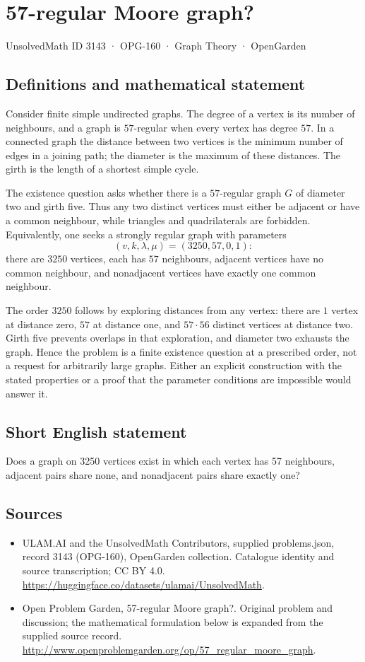 \documentclass[11pt,a4paper]{article}
\begin{document}
\section*{57-regular Moore graph?}\label{3143}
{\small UnsolvedMath ID 3143 · OPG-160 · Graph Theory · OpenGarden}
\subsection{Definitions and mathematical statement}
Consider finite simple undirected graphs. The degree of a vertex is
its number of neighbours, and a graph is $57$-regular when every
vertex has degree $57$. In a connected graph the distance between
two vertices is the minimum number of edges in a joining path;
the diameter is the maximum of these distances. The girth is the
length of a shortest simple cycle.

The existence question asks whether there is a $57$-regular graph
$G$ of diameter two and girth five. Thus any two distinct vertices
must either be adjacent or have a common neighbour, while triangles
and quadrilaterals are forbidden. Equivalently, one seeks a strongly
regular graph with parameters
\[
 (v,k,\lambda,\mu)=(3250,57,0,1):
\]
there are $3250$ vertices, each has $57$ neighbours, adjacent
vertices have no common neighbour, and nonadjacent vertices have
exactly one common neighbour.

The order $3250$ follows by exploring distances from any vertex:
there are $1$ vertex at distance zero, $57$ at distance one, and
$57\cdot56$ distinct vertices at distance two. Girth five prevents
overlaps in that exploration, and diameter two exhausts the graph.
Hence the problem is a finite existence question at a prescribed
order, not a request for arbitrarily large graphs. Either an
explicit construction with the stated properties or a proof that
the parameter conditions are impossible would answer it.
\subsection{Short English statement}
Does a graph on 3250 vertices exist in which each vertex has 57 neighbours, adjacent pairs share none, and nonadjacent pairs share exactly one?
\subsection{Sources}
\begin{itemize}
\item[S1] ULAM.AI and the UnsolvedMath Contributors, supplied problems.json, record 3143 (OPG-160), OpenGarden collection. Catalogue identity and source transcription; CC BY 4.0.
\url{https://huggingface.co/datasets/ulamai/UnsolvedMath}.
\item[S2] Open Problem Garden, 57-regular Moore graph?. Original problem and discussion; the mathematical formulation below is expanded from the supplied source record.
\url{http://www.openproblemgarden.org/op/57_regular_moore_graph}.
\end{itemize}
\end{document}

